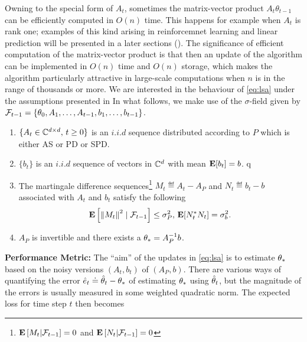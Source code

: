 Owning to the special form of $A_t$, sometimes the matrix-vector product $A_t \theta_{t-1}$
can be efficiently computed in $O(n)$ time.
This happens for example when $A_t$ is rank one; examples of this kind arising in reinforcemnet learning \cite{} and linear prediction \cite{} will be presented in a later sections (). The significance of efficient computation of the matrix-vector product is that then an update of the algorithm
can be implemented in $O(n)$ time and $O(n)$ storage, which makes the algorithm particularly attractive in large-scale computations when $n$ is in the range of thousands or more.
We are interested in the behaviour of \eqref{eq:lsa} under the assumptions presented in  In what follows, we make use of the $\sigma$-field given by $\mathcal{F}_{t-1}=\{\theta_0,A_1,\ldots, A_{t-1}, b_1,\ldots, b_{t-1}\}$.
\begin{assumption}\label{assmp:lsa}
\begin{enumerate}[leftmargin=*, before = \leavevmode\vspace{-\baselineskip}]
\item \label{dist} $\{A_t\in\mathbb{C}^{d \times d},\, t\geq 0\}$ is an $i.i.d$ sequence distributed according to $P$ which is either AS or PD or SPD.
\item $\{b_t\}$ is an $i.i.d$ sequence of vectors in $\mathbb{C}^d$ with mean $\mathbf{E}[b_t]=b$.
q\item \label{matvar} The martingale difference sequences\footnote{$\mathbf{E}\left[M_t|\mathcal{F}_{t-1}\right]=0$ and $\mathbf{E}\left[N_t|\mathcal{F}_{t-1}\right]=0$} $M_t\eqdef A_t-A_P$ and $N_t\eqdef b_t-b$ associated with $A_t$ and $b_t$ satisfy the following
\begin{align*}\mathbf{E}\left[ \left\| M_t\right\|^2\mid\mathcal{F}_{t-1}\right]\leq \sigma^2_P, \, \mathbf{E}[N_t^* N_t]=\sigma_b^2.\end{align*}
\item $A_P$ is invertible and there exists a $\theta_*=A_P^{-1}b$.
\end{enumerate}
\end{assumption}
\textbf{Performance Metric:}
The ``aim'' of the updates in \eqref{eq:lsa} is to estimate $\theta_*$ based on the noisy versions $(A_t,b_t)$ of $(A_P,b)$.
There are various ways of quantifying the error $\hat{e}_t \doteq \hat{\theta}_t- \theta_*$ of estimating $\theta_*$ using $\hat{\theta}_t$, but the magnitude
of the errors is usually measured in some weighted quadratic norm. The expected loss for time step $t$ then becomes
